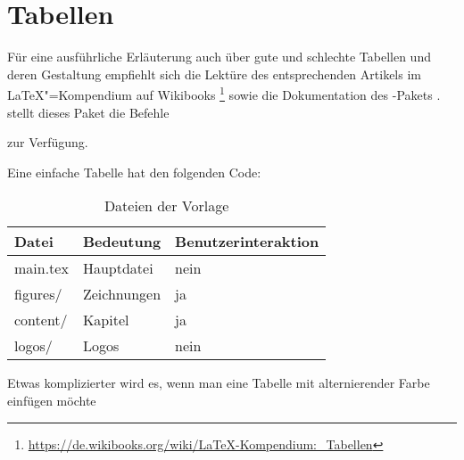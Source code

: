 \section{Tabellen}%
\label{sec:Tabellen}
Für eine ausführliche Erläuterung auch über gute und schlechte Tabellen
und deren Gestaltung empfiehlt sich die Lektüre des entsprechenden Artikels im \LaTeX{}"=Kompendium auf Wikibooks%
\footnote{\url{https://de.wikibooks.org/wiki/LaTeX-Kompendium:_Tabellen}}
sowie die Dokumentation des -Pakets \cite{Fear2005}.
\Ua stellt dieses Paket die Befehle
\begin{itemize*}
  \item {}
	\item {}
	\item {}
\end{itemize*}
zur Verfügung.

Eine einfache Tabelle hat den folgenden Code:

\begin{latex}[caption={Einfache Tabelle in \LaTeX},label={lst:tables}]
\begin{table}%
	\centering%
	\begin{tabularx}{\columnwidth}{l l X}%
		\toprule%
		Datei       &  Bedeutung    &  Benutzerinteraktion \\%
		\midrule%
		\endheader%
		main.tex  &  Hauptdatei   &  nein     \\%
		figures/  &  Zeichnungen  &  ja       \\%
		content/  &  Kapitel      &  ja       \\%
		logos/    &  Logos        &  nein     \\%
		\bottomrule%
	\end{tabularx}%
	\caption{Dateien der Vorlage}%
	\label{tab:files-dirs-of-template}%
\end{table}
\end{latex}


Etwas komplizierter wird es, wenn man eine Tabelle mit alternierender Farbe einfügen möchte
%
%
%
%
%
%

